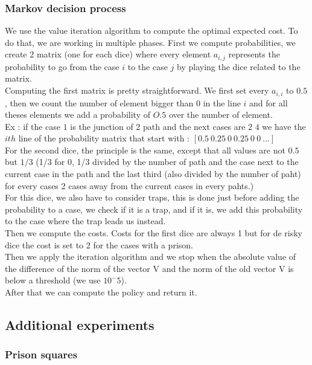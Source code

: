 \documentclass{eplDoc}
\begin{document}
\subsubsection{Markov decision process}
We use the value iteration algorithm to compute the optimal expected cost. 
To do that, we are working in multiple phases.  First we compute probabilities, 
we create 2 matrix (one for each dice) where every element $a_{i,j}$ represents 
the probability to go from the case $i$ to the case $j$ by playing the dice related to the matrix.\\
Computing the first matrix is pretty straightforward.  We first set every $a_{i,i}$ to $0.5$, then we count the number of element bigger than $0$ in the line $i$ and for all theses elements we add a probability of $O.5$ over the number of element. \\
Ex : if the case $1$ is the junction of 2 path and the next cases are $2$ $4$ we have the $i th$ line of the probability matrix that start with : $[0.5\  0.25\ 0\ 0.25\ 0\ 0\ ...]$\\
For the second dice, the principle is the same, except that all values are not $0.5$ but $1/3$ (1/3 for 0,  1/3 divided by the number of path and the case next to the current case in the path and the last third (also divided by the number of paht) for every cases 2 cases away from the current cases in every pahts.)\\
For this dice, we also have to consider traps, this is done just before adding the probability to a case, we check if it is a trap, and if it is, we add this probability to the case where the trap leads us instead.\\
Then we compute the costs.  Costs for the first dice are always 1 but for de risky dice the cost is set to 2 for the cases with a prison.\\
Then we apply the iteration algorithm and we stop when the absolute value of the difference of the norm of the vector V and the norm of the old vector V is below a threshold (we use $10^-5$).\\
After that we can compute the policy and return it.





\subsection{Additional experiments}


\subsubsection{Prison squares}
\end{document}
